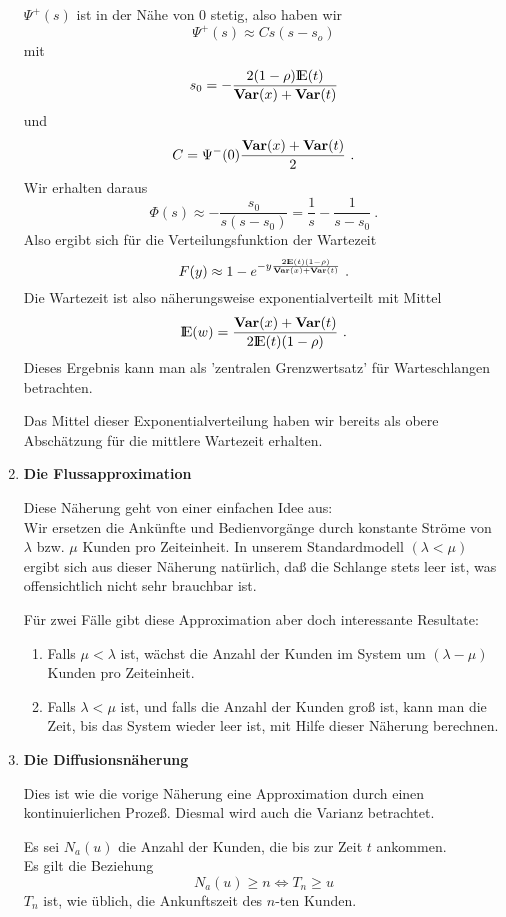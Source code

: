 \begin{enumerate}
$\Psi^{+}(s)$ ist in der Nähe von $0$ stetig, also haben wir
\[\Psi^{+}(s) \approx Cs(s-s_{o})\]
mit
\[s_{0}=-\frac{2(1-\rho){\rm I\kern-0.2em E}(t)}{{\bf Var}(x)+{\bf Var}(t)} \]
und
\[C=\Psi^{-}(0)\frac{{\bf Var}(x)+{\bf Var}(t)}{2} ~. \]
Wir erhalten daraus
\[\Phi(s) \approx -\frac{s_{0}}{s(s-s_{0})}=\frac{1}{s}-\frac{1}{s-s_{0}} ~.\]
Also ergibt sich für die Verteilungsfunktion der Wartezeit
\[ F(y) \approx 1 - e^{-y\frac{2{\rm I\kern-0.2em E}(t)(1-\rho)}{{\bf Var}(x)+{\bf Var}(t)}} ~.\]
Die Wartezeit ist also näherungsweise exponentialverteilt mit Mittel
\[{\rm I\kern-0.2em E}(w)=\frac{{\bf Var}(x)+{\bf Var}(t)}{2{\rm I\kern-0.2em E}(t)(1-\rho)} ~.\]
Dieses Ergebnis kann man als 'zentralen Grenzwertsatz' für Warteschlangen betrachten.

Das Mittel dieser Exponentialverteilung haben wir bereits als obere
Abschätzung für die mittlere Wartezeit erhalten.

\item{\bf Die Flussapproximation}

Diese Näherung geht von einer einfachen Idee aus:\\
Wir ersetzen die Ankünfte und Bedienvorgänge durch konstante Ströme von $\lambda$ bzw. $\mu$ Kunden
pro Zeiteinheit. In unserem Standardmodell $(\lambda < \mu)$ ergibt sich aus dieser Näherung natürlich, daß die
Schlange stets leer ist, was offensichtlich nicht sehr brauchbar ist.

Für zwei Fälle gibt diese Approximation aber doch interessante Resultate:
   \begin{enumerate}
   \item Falls $\mu < \lambda$ ist, wächst die Anzahl der Kunden im System um $(\lambda - \mu)$ Kunden pro Zeiteinheit.
   \item Falls $\lambda < \mu$ ist, und falls die Anzahl der Kunden groß ist, kann man die Zeit, bis das System wieder leer ist, mit Hilfe dieser
         Näherung berechnen.
   \end{enumerate}

\item{\bf Die Diffusionsnäherung}

Dies ist wie die vorige Näherung eine Approximation durch einen kontinuierlichen Prozeß. Diesmal wird auch die Varianz betrachtet.

Es sei $N_{a}(u)$ die Anzahl der Kunden, die bis zur Zeit $t$ ankommen.\\
Es gilt die Beziehung
\[ N_{a}(u) \geq n \Leftrightarrow T_{n} \geq u \]
$T_{n}$ ist, wie üblich, die Ankunftszeit des $n$-ten Kunden.


\end{enumerate}
